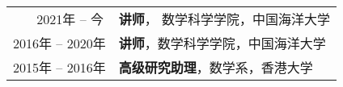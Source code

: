 %
%


 
 \begin{tabular}{rl}	
	\textsc{2021年 -- \quad 今\,\quad}  & \textbf{讲师}， 数学科学学院，中国海洋大学\\
	\textsc{2016年 -- 2020年} 	&  \textbf{讲师}，数学科学学院，中国海洋大学\\		
	\textsc{2015年 -- 2016年} 	&  \textbf{高级研究助理}，数学系，香港大学
\end{tabular}

